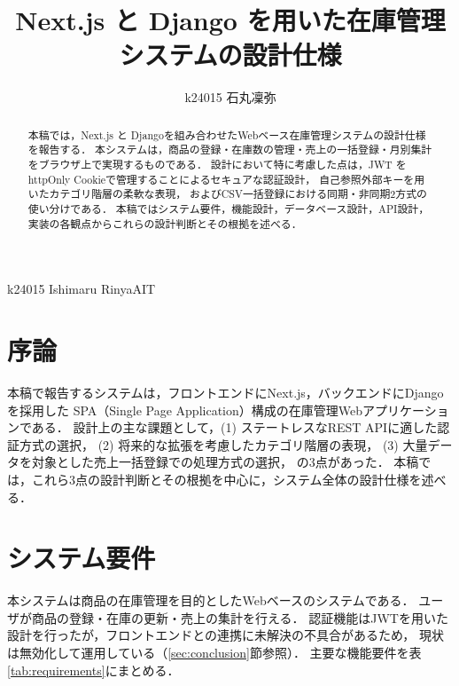 \documentclass[submit,techrep]{ipsj}
\begin{document}
\title{Next.js と Django を用いた在庫管理システムの設計仕様}


\author{k24015 石丸凜弥}{k24015 Ishimaru Rinya}{AIT}

\begin{abstract}
本稿では，Next.js と Djangoを組み合わせたWebベース在庫管理システムの設計仕様を報告する．
本システムは，商品の登録・在庫数の管理・売上の一括登録・月別集計をブラウザ上で実現するものである．
設計において特に考慮した点は，JWT をhttpOnly Cookieで管理することによるセキュアな認証設計，
自己参照外部キーを用いたカテゴリ階層の柔軟な表現，
およびCSV一括登録における同期・非同期2方式の使い分けである．
本稿ではシステム要件，機能設計，データベース設計，API設計，実装の各観点からこれらの設計判断とその根拠を述べる．
\end{abstract}

\maketitle

\section{序論}

本稿で報告するシステムは，フロントエンドにNext.js，バックエンドにDjangoを採用した
SPA（Single Page Application）構成の在庫管理Webアプリケーションである．
設計上の主な課題として，(1) ステートレスなREST APIに適した認証方式の選択，
(2) 将来的な拡張を考慮したカテゴリ階層の表現，
(3) 大量データを対象とした売上一括登録での処理方式の選択，
の3点があった．
本稿では，これら3点の設計判断とその根拠を中心に，システム全体の設計仕様を述べる．

\section{システム要件}

本システムは商品の在庫管理を目的としたWebベースのシステムである．
ユーザが商品の登録・在庫の更新・売上の集計を行える．
認証機能はJWTを用いた設計を行ったが，フロントエンドとの連携に未解決の不具合があるため，
現状は無効化して運用している（\ref{sec:conclusion}節参照）．
主要な機能要件を表\ref{tab:requirements}にまとめる．
\end{document}
